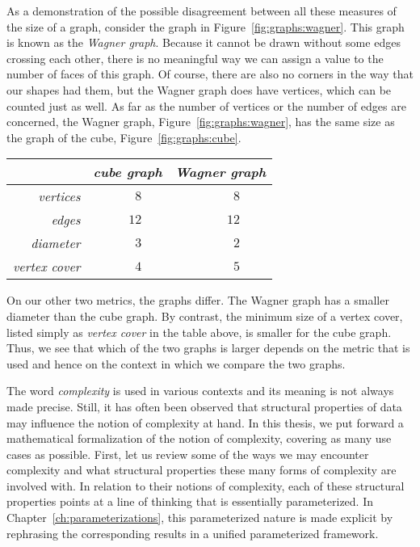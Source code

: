 As a demonstration of the possible disagreement between all these measures of the size of a graph, consider the graph in Figure~\ref{fig:graphs:wagner}.
This graph is known as the \emph{Wagner graph}.
Because it cannot be drawn without some edges crossing each other, there is no meaningful way we can assign a value to the number of faces of this graph.
Of course, there are also no corners in the way that our shapes had them, but the Wagner graph does have vertices, which can be counted just as well.
As far as the number of vertices or the number of edges are concerned, the Wagner graph, Figure~\ref{fig:graphs:wagner}, has the same size as the graph of the cube, Figure~\ref{fig:graphs:cube}.
\begin{center}
  \begin{tabular}{r|p{2em}rp{1em}p{2em}rp{1em}}
    &	\multicolumn{3}{c}{\emph{cube graph}}	& \multicolumn{3}{c}{\emph{Wagner graph}} \\
    \hline
    \emph{vertices}	&& $8$	&&& $8$ \\
    \emph{edges}	&& $12$	&&& $12$	& \hspace{0pt} \\
    \emph{diameter}	&& $3$	&&& $2$ \\
    \emph{vertex cover}	&& $4$	&&& $5$
  \end{tabular}
\end{center}
On our other two metrics, the graphs differ.
The Wagner graph has a smaller diameter than the cube graph.
By contrast, the minimum size of a vertex cover, listed simply as \emph{vertex cover} in the table above, is smaller for the cube graph.
Thus, we see that which of the two graphs is larger depends on the metric that is used and hence on the context in which we compare the two graphs.


\label{sec:history}%

The word \emph{complexity} is used in various contexts and its meaning is not always made precise.
Still, it has often been observed that structural properties of data may influence the notion of complexity at hand.
In this thesis, we put forward a mathematical formalization of the notion of complexity, covering as many use cases as possible.
First, let us review some of the ways we may encounter complexity and what structural properties these many forms of complexity are involved with.
In relation to their notions of complexity, each of these structural properties points at a line of thinking that is essentially parameterized.
In Chapter~\ref{ch:parameterizations}, this parameterized nature is made explicit by rephrasing the corresponding results in a unified parameterized framework.

